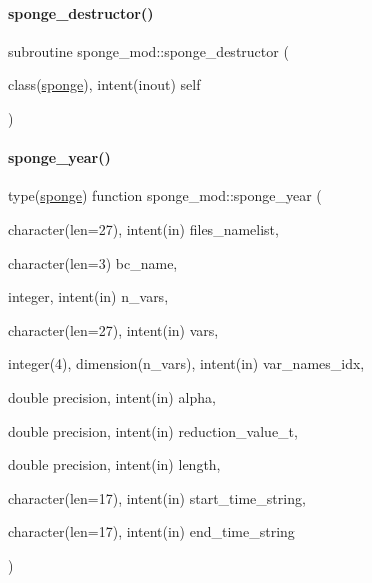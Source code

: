 \mbox{\label{namespacesponge__mod_a9c2f44eaa685af1b1a2145dc9c60003d}} 
\paragraph{\texorpdfstring{sponge\+\_\+destructor()}{sponge\_destructor()}}
{\footnotesize\ttfamily subroutine sponge\+\_\+mod\+::sponge\+\_\+destructor (\begin{DoxyParamCaption}\item[{class(\mbox{\hyperlink{structsponge__mod_1_1sponge}{sponge}}), intent(inout)}]{self }\end{DoxyParamCaption})}

\mbox{\label{namespacesponge__mod_a3bc4faf589787c9eb594de38fcbc83b3}} 
\paragraph{\texorpdfstring{sponge\+\_\+year()}{sponge\_year()}}
{\footnotesize\ttfamily type(\mbox{\hyperlink{structsponge__mod_1_1sponge}{sponge}}) function sponge\+\_\+mod\+::sponge\+\_\+year (\begin{DoxyParamCaption}\item[{character(len=27), intent(in)}]{files\+\_\+namelist,  }\item[{character(len=3)}]{bc\+\_\+name,  }\item[{integer, intent(in)}]{n\+\_\+vars,  }\item[{character(len=27), intent(in)}]{vars,  }\item[{integer(4), dimension(n\+\_\+vars), intent(in)}]{var\+\_\+names\+\_\+idx,  }\item[{double precision, intent(in)}]{alpha,  }\item[{double precision, intent(in)}]{reduction\+\_\+value\+\_\+t,  }\item[{double precision, intent(in)}]{length,  }\item[{character(len=17), intent(in)}]{start\+\_\+time\+\_\+string,  }\item[{character(len=17), intent(in)}]{end\+\_\+time\+\_\+string }\end{DoxyParamCaption})\hspace{0.3cm}{\ttfamily [private]}}


